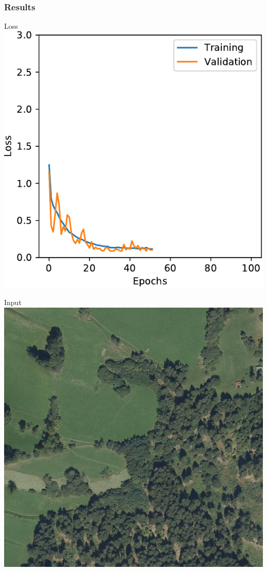 \documentclass[usenames,dvipsnames,10pt]{beamer}
\begin{document}
\begin{frame}
\frametitle{Results}
\begin{minipage}[]{0.3\textwidth}
	\centering
	Loss
	\includegraphics[width=\textwidth]{graphics/loss06.pdf}
\end{minipage}
\hspace{0.25cm}
\begin{minipage}[]{0.3\textwidth}
	\centering
	Input
	\includegraphics[width=\textwidth]{graphics/aerial06.jpg}

\end{minipage}
\end{frame}
\end{document}
